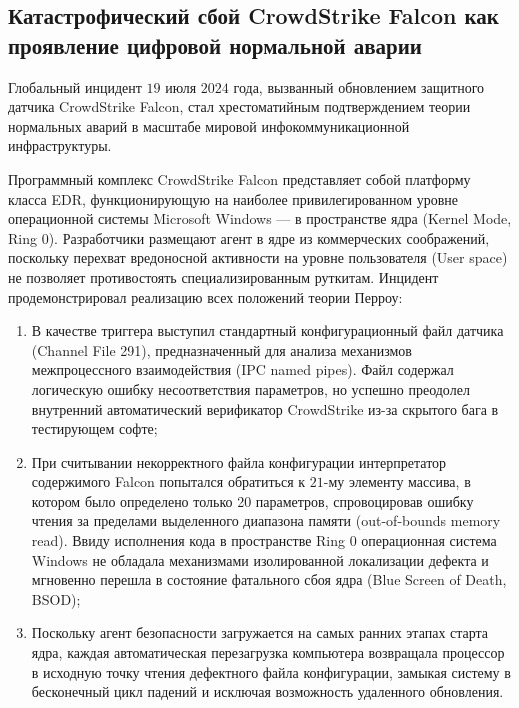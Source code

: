 \documentclass[12pt,a4paper]{article}
\begin{document}
\subsection{Катастрофический сбой CrowdStrike Falcon как проявление цифровой нормальной аварии}

Глобальный инцидент $19$ июля $2024$ года, вызванный обновлением 
защитного датчика CrowdStrike Falcon, стал хрестоматийным 
подтверждением теории нормальных аварий в масштабе мировой 
инфокоммуникационной инфраструктуры.

Программный комплекс CrowdStrike Falcon представляет собой платформу 
класса EDR, функционирующую на наиболее привилегированном уровне 
операционной системы Microsoft Windows --- в пространстве ядра 
(Kernel Mode, Ring $0$). Разработчики размещают агент в ядре из 
коммерческих соображений, поскольку перехват вредоносной активности 
на уровне пользователя (User space) не позволяет противостоять 
специализированным руткитам. Инцидент продемонстрировал реализацию всех 
положений теории Перроу:
\begin{enumerate}[leftmargin=2em, itemsep=0.2em]
    \item В качестве триггера выступил стандартный конфигурационный 
    файл датчика (Channel File 291), предназначенный для анализа 
    механизмов межпроцессного взаимодействия (IPC named pipes). Файл 
    содержал логическую ошибку несоответствия параметров, но успешно 
    преодолел внутренний автоматический верификатор CrowdStrike из-за 
    скрытого бага в тестирующем софте;
    \item При считывании некорректного файла конфигурации интерпретатор 
    содержимого Falcon попытался обратиться к $21$-му элементу массива, 
    в котором было определено только 20 параметров, спровоцировав ошибку 
    чтения за пределами выделенного диапазона памяти (out-of-bounds 
    memory read). Ввиду исполнения кода в пространстве Ring $0$ 
    операционная система Windows не обладала механизмами изолированной 
    локализации дефекта и мгновенно перешла в состояние фатального сбоя 
    ядра (Blue Screen of Death, BSOD);
    \item Поскольку агент безопасности загружается на самых ранних 
    этапах старта ядра, каждая автоматическая перезагрузка компьютера 
    возвращала процессор в исходную точку чтения дефектного файла 
    конфигурации, замыкая систему в бесконечный цикл падений и исключая 
    возможность удаленного обновления.
\end{enumerate}
\end{document}
